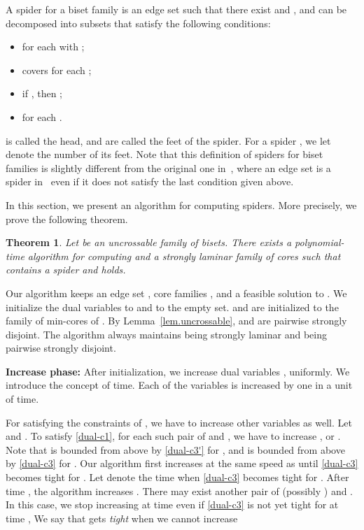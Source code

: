 \documentclass[11pt]{article}
\newtheorem{theorem}{Theorem}
\begin{document}
A spider for a biset family  is an edge set  
such that there exist  and , and  can be decomposed into subsets 
that satisfy the following conditions:
\begin{itemize}
 \item  for each  with
       ;
 \item  covers  for each ;
 \item if , then ;
 \item  for each .
\end{itemize}
 is called the head, and  are called the feet of the spider.
For a spider , we let  denote the number of its feet.
Note that this definition of spiders for biset families
is slightly different from the original one
in~\cite{Nutov12uncrossable}, where
an edge set is a spider in~\cite{Nutov12uncrossable} even if it does not
satisfy the last condition given above.



In this section, we present an algorithm for computing spiders.
More precisely, we prove the following theorem.

\begin{theorem}\label{thm.spideralgorithm}
 Let  be an uncrossable family of bisets.
 There exists a polynomial-time algorithm for computing 
 and a strongly laminar family  of cores
 such that
  contains a spider  and 
  holds.
\end{theorem}


Our algorithm keeps 
an edge set , 
core families ,
and a feasible solution  to .
We initialize the dual variables  to  and  to the empty set.
 and  are initialized to the family  of min-cores of .
By Lemma~\ref{lem.uncrossable}, 
 and  are pairwise strongly disjoint.
The algorithm always
maintains  being strongly laminar and  being pairwise strongly disjoint.


{\bf Increase phase:}
After initialization, we increase dual variables
,  uniformly.
We introduce the concept of time. Each of the variables is
increased by one in a unit of time. 

For satisfying the constraints of ,
we have to increase other variables as well.
Let  and .
To satisfy \eqref{dual-c1},
for each such pair of  and , 
we have to increase 
,
or .
Note that  
is bounded from above by \eqref{dual-c3'} for ,
and  is bounded from above 
by \eqref{dual-c3} for .
Our algorithm first increases  at the same speed
as  until 
\eqref{dual-c3} becomes tight for .
Let  denote the time when 
\eqref{dual-c3} becomes tight for .
After time ,
the algorithm increases .
There may exist another pair of  (possibly
) and .
In this case,
we stop increasing  
at time 
even if \eqref{dual-c3} is not yet
tight for  at time ,
We say that  gets {\em tight}
when we cannot increase 
 
\end{document}
